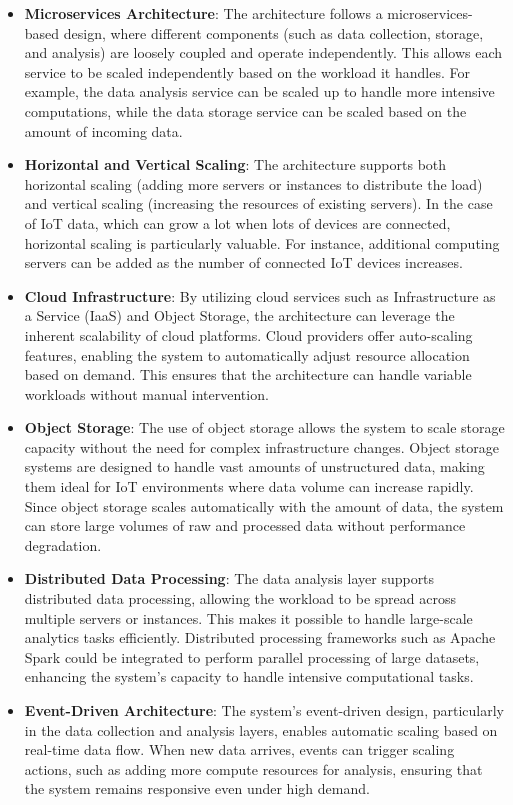 \begin{itemize}
    \item \textbf{Microservices Architecture}: The architecture follows a microservices-based design, where different components (such as data collection, storage, and analysis) are loosely coupled and operate independently. This allows each service to be scaled independently based on the workload it handles. For example, the data analysis service can be scaled up to handle more intensive computations, while the data storage service can be scaled based on the amount of incoming data.
    
    \item \textbf{Horizontal and Vertical Scaling}: The architecture supports both horizontal scaling (adding more servers or instances to distribute the load) and vertical scaling (increasing the resources of existing servers). In the case of IoT data, which can grow a lot when lots of devices are connected, horizontal scaling is particularly valuable. For instance, additional computing servers can be added as the number of connected IoT devices increases. 
    
    \item \textbf{Cloud Infrastructure}: By utilizing cloud services such as Infrastructure as a Service (IaaS) and Object Storage, the architecture can leverage the inherent scalability of cloud platforms. Cloud providers offer auto-scaling features, enabling the system to automatically adjust resource allocation based on demand. This ensures that the architecture can handle variable workloads without manual intervention.

    \item \textbf{Object Storage}: The use of object storage allows the system to scale storage capacity without the need for complex infrastructure changes. Object storage systems are designed to handle vast amounts of unstructured data, making them ideal for IoT environments where data volume can increase rapidly. Since object storage scales automatically with the amount of data, the system can store large volumes of raw and processed data without performance degradation.
    
    \item \textbf{Distributed Data Processing}: The data analysis layer supports distributed data processing, allowing the workload to be spread across multiple servers or instances. This makes it possible to handle large-scale analytics tasks efficiently. Distributed processing frameworks such as Apache Spark could be integrated to perform parallel processing of large datasets, enhancing the system’s capacity to handle intensive computational tasks.

    \item \textbf{Event-Driven Architecture}: The system's event-driven design, particularly in the data collection and analysis layers, enables automatic scaling based on real-time data flow. When new data arrives, events can trigger scaling actions, such as adding more compute resources for analysis, ensuring that the system remains responsive even under high demand.
\end{itemize}


